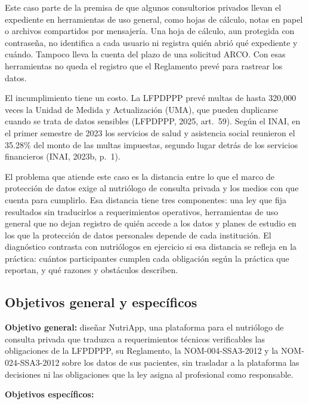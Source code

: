 \documentclass[12pt, a4paper]{article}
\begin{document}
Este caso parte de la premisa de que algunos consultorios privados
llevan el expediente en herramientas de uso general, como hojas de
cálculo, notas en papel o archivos compartidos por mensajería. Una hoja
de cálculo, aun protegida con contraseña, no identifica a cada usuario
ni registra quién abrió qué expediente y cuándo. Tampoco lleva la
cuenta del plazo de una solicitud ARCO. Con esas herramientas no queda
el registro que el Reglamento prevé para rastrear los datos.
 
El incumplimiento tiene un costo. La LFPDPPP prevé multas de hasta
320,000 veces la Unidad de Medida y Actualización (UMA), que pueden
duplicarse cuando se trata de datos sensibles (LFPDPPP, 2025,
art.~59). Según el INAI, en el primer semestre de 2023 los servicios de
salud y asistencia social reunieron el 35.28\% del monto de las multas
impuestas, segundo lugar detrás de los servicios financieros (INAI,
2023b, p.~1).
 
El problema que atiende este caso es la distancia entre lo que el marco
de protección de datos exige al nutriólogo de consulta privada y los
medios con que cuenta para cumplirlo. Esa distancia tiene tres
componentes: una ley que fija resultados sin traducirlos a
requerimientos operativos, herramientas de uso general que no dejan
registro de quién accede a los datos y planes de estudio en los que la
protección de datos personales depende de cada institución. El
diagnóstico contrasta con nutriólogos en ejercicio si esa distancia se
refleja en la práctica: cuántos
participantes cumplen cada obligación según la práctica que reportan, y
qué razones y obstáculos describen.

\subsection{Objetivos general y específicos}
\textbf{Objetivo general:} diseñar NutriApp, una plataforma para el
nutriólogo de consulta privada que traduzca a requerimientos técnicos
verificables las obligaciones de la LFPDPPP, su Reglamento, la
NOM-004-SSA3-2012 y la NOM-024-SSA3-2012 sobre los datos de sus
pacientes, sin trasladar a la plataforma las decisiones ni las
obligaciones que la ley asigna al profesional como responsable.
 
\textbf{Objetivos específicos:}
 
\end{document}
